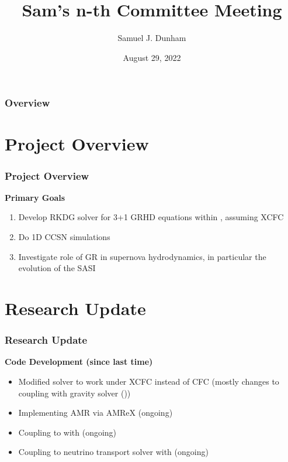 \documentclass{beamer}
\title[Committee Meeting]{Sam's n-th Committee Meeting}
\author{Samuel J. Dunham}
\institute[Vanderbilt University]
{
Vanderbilt University \\
\medskip
\textit{samuel.j.dunham@vanderbilt.edu}
}
\date{August 29, 2022}
\begin{document}
\begin{frame}
\titlepage
\end{frame}

\begin{frame}
\frametitle{Overview}
\tableofcontents
\end{frame}


\section{Project Overview}

\begin{frame}
\frametitle{Project Overview}

\textbf{Primary Goals}
\begin{enumerate}
  \item Develop RKDG solver for 3+1 GRHD equations within \thornado{},
        assuming XCFC
  \item Do 1D CCSN simulations
  \item Investigate role of GR in supernova hydrodynamics,
        in particular the evolution of the SASI
\end{enumerate}

\end{frame}

\section{Research Update}

\begin{frame}
\frametitle{Research Update}

\textbf{Code Development (since last time)}
\begin{itemize}
  \item Modified solver to work under XCFC instead of CFC
        (mostly changes to coupling with gravity solver (\poseidon))
  \item Implementing AMR via AMReX (ongoing)
  \item Coupling to \poseidon{} with \amrex{} (ongoing)
  \item Coupling to neutrino transport solver with \amrex{} (ongoing)
\end{itemize}

\end{frame}
\end{document}
